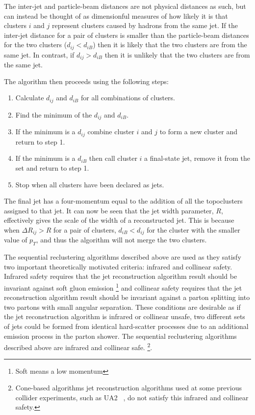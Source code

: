 The inter-jet and particle-beam distances are not physical distances as such, but can instead be thought of as dimensionful measures of how likely it is that
clusters $i$ and $j$ represent clusters caused by hadrons from the same jet.
If the inter-jet distance for a pair of clusters is smaller than the particle-beam distances for the two clusters ($d_{ij} < d_{iB}$) 
then it is likely that the two clusters are from the same jet. 
In contrast, if $d_{ij} > d_{iB}$ then it is unlikely that the two clusters are from the same jet.
 
\noindent The algorithm then proceeds using the following steps:
\vspace{-1em}
\begin{enumerate}[nolistsep]
  \item Calculate $d_{ij}$ and $d_{iB}$ for all combinations of clusters.  
  \item Find the minimum of the $d_{ij}$ and $d_{iB}$. 
  \item If the minimum is a $d_{ij}$ combine cluster $i$ and $j$ to form a new cluster and return to step 1. 
  \item If the minimum is a $d_{iB}$ then call cluster $i$ a final-state jet, remove it from the set and return to step 1.  
  \item Stop when all clusters have been declared as jets. 
\end{enumerate} 
The final jet has a four-momentum equal to the addition of all the topoclusters assigned to that jet.
It can now be seen that the jet width parameter, $R$, effectively gives the scale of the width of a reconstructed jet.
This is because when $\Delta R_{ij} > R$ for a pair of clusters,
$d_{iB} < d_{ij}$ for the cluster with the smaller value of ${p_T}$,
and thus the algorithm will not merge the two clusters.

The sequential reclustering algorithms described above are used as they satisfy two important theoretically motivated criteria:
infrared and collinear safety.
Infrared safety requires that the jet reconstruction algorithm result should be invariant against soft gluon emission \footnote{Soft means a low momentum}
and collinear safety requires that the jet reconstruction algorithm result should be invariant against a parton splitting into two partons with small angular separation.
These conditions are desirable as if the jet reconstruction algorithm is infrared or collinear unsafe,
two different sets of jets could be formed from identical hard-scatter processes
due to an additional emission process in the parton shower.
The sequential reclustering algorithms described above are infrared and collinear safe.
\footnote{Cone-based algorithms jet reconstruction algorithms used at some previous collider experiments,
  such as UA2 ~\cite{obj-jets_reco_UA2}, do not satisfy this infrared and collinear safety.}.

